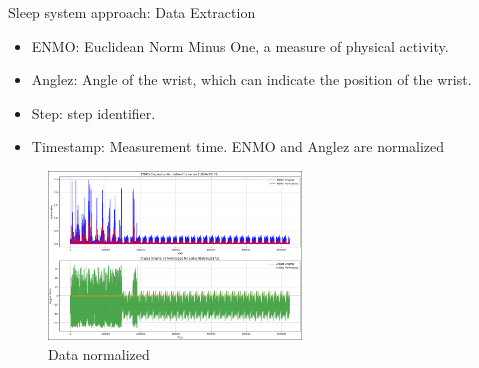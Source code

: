 \documentclass[10pt]{beamer} %
\begin{document}
\begin{frame}{Sleep system approach: Data Extraction  } %
 \begin{itemize}
    \item \footnotesize ENMO: Euclidean Norm Minus One, a measure of physical activity.
    \item \footnotesize Anglez: Angle of the wrist, which can indicate the position of the wrist.
    \item \footnotesize Step: step identifier.
    \item \footnotesize Timestamp: Measurement time.
\footnotesize ENMO and Anglez are normalized
\end{itemize}
          \begin{figure}
              \centering
             \includegraphics[width=0.6\textwidth]{figures/data_normalizate.png} %
             \caption{Data normalized} %
             \end{figure}

\end{frame}
\end{document}
